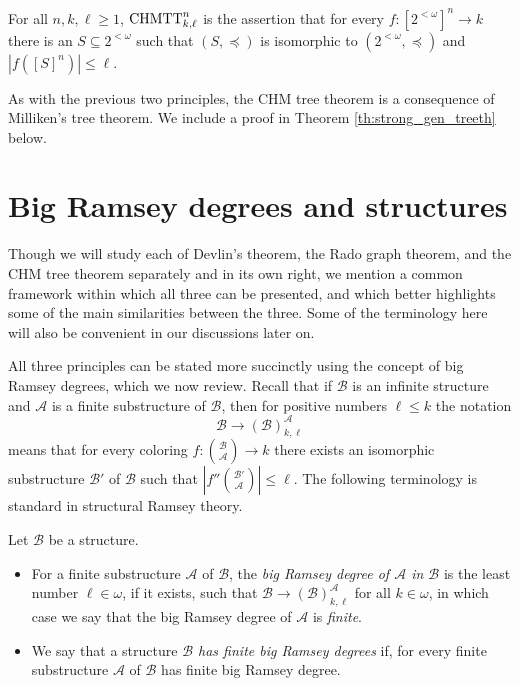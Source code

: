 \begin{statement}
	For all $n,k,\ell \geq 1$,	$\mathrm{CHMTT}^n_{k,\ell}$ is the assertion that for every $f: [2^{<\omega}]^n \to k$ there is an $S \subseteq 2^{<\omega}$ such that $(S,\preceq)$ is isomorphic to $(2^{<\omega},\preceq)$ and $|f ([S]^n)| \leq \ell$.
\end{statement}


\noindent As with the previous two principles, the CHM tree theorem is a consequence of Milliken's tree theorem. We include a proof in Theorem \ref{th:strong_gen_treeth} below.

\section{Big Ramsey degrees and structures}\label{sec:bigRamsey}

Though we will study each of Devlin's theorem, the Rado graph theorem, and the CHM tree theorem separately and in its own right, we mention a common framework within which all three can be presented, and which better highlights some of the main similarities between the three. Some of the terminology here will also be convenient in our discussions later on.

All three principles can be stated more succinctly using the concept of big Ramsey degrees, which we now review. Recall that if $\mathcal{B}$ is an infinite structure and $\mathcal{A}$ is a finite substructure of $\mathcal{B}$, then for positive numbers $\ell \leq k$ the notation
\[
\mathcal{B} \to (\mathcal{B})^{\mathcal{A}}_{k,\ell}
\]
means that for every coloring $f: {\mathcal{B} \choose \mathcal{A}} \to k$ there exists an isomorphic substructure $\mathcal{B}'$ of $\mathcal{B}$ such that $|f '' {\mathcal{B}' \choose \mathcal{A}}| \leq \ell$. The following terminology is standard in structural Ramsey theory.

\begin{definition}\label{D:bigRamsey}
	Let $\mathcal{B}$ be a structure.
	\begin{itemize}
		\item For a finite substructure $\mathcal{A}$ of $\mathcal{B}$, the \emph{big Ramsey degree of $\mathcal{A}$ in $\mathcal{B}$}   is the least number $\ell \in \omega$, if it exists, such that $\mathcal{B} \to (\mathcal{B})^\mathcal{A}_{k,\ell}$ for all $k \in \omega$, in which case we say that the big Ramsey degree of $\mathcal{A}$ is \emph{finite}.
		\item We say that a structure \emph{$\mathcal{B}$ has finite big Ramsey degrees}  if, for every finite substructure $\mathcal{A}$ of $\mathcal{B}$ has finite big Ramsey degree.
	\end{itemize}
\end{definition}

